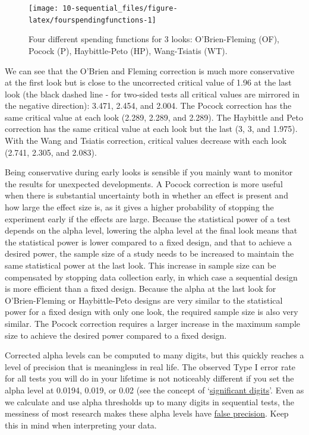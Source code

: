 \documentclass[
  oneside]{krantz}
\begin{document}
\begin{figure}

{\centering \texttt{[image: 10-sequential\_files/figure-latex/fourspendingfunctions-1]} 

}

\caption{Four different spending functions for 3 looks: O'Brien-Fleming (OF), Pocock (P), Haybittle-Peto (HP), Wang-Tsiatis (WT).}\label{fig:fourspendingfunctions}
\end{figure}

We can see that the O'Brien and Fleming correction is much more conservative at the first look but is close to the uncorrected critical value of 1.96 at the last look (the black dashed line - for two-sided tests all critical values are mirrored in the negative direction): 3.471, 2.454, and 2.004. The Pocock correction has the same critical value at each look (2.289, 2.289, and 2.289). The Haybittle and Peto correction has the same critical value at each look but the last (3, 3, and 1.975). With the Wang and Tsiatis correction, critical values decrease with each look (2.741, 2.305, and 2.083).

Being conservative during early looks is sensible if you mainly want to monitor the results for unexpected developments. A Pocock correction is more useful when there is substantial uncertainty both in whether an effect is present and how large the effect size is, as it gives a higher probability of stopping the experiment early if the effects are large. Because the statistical power of a test depends on the alpha level, lowering the alpha level at the final look means that the statistical power is lower compared to a fixed design, and that to achieve a desired power, the sample size of a study needs to be increased to maintain the same statistical power at the last look. This increase in sample size can be compensated by stopping data collection early, in which case a sequential design is more efficient than a fixed design. Because the alpha at the last look for O'Brien-Fleming or Haybittle-Peto designs are very similar to the statistical power for a fixed design with only one look, the required sample size is also very similar. The Pocock correction requires a larger increase in the maximum sample size to achieve the desired power compared to a fixed design.

Corrected alpha levels can be computed to many digits, but this quickly reaches a level of precision that is meaningless in real life. The observed Type I error rate for all tests you will do in your lifetime is not noticeably different if you set the alpha level at 0.0194, 0.019, or 0.02 (see the concept of `\href{https://en.wikipedia.org/wiki/Significant_figures}{significant digits}'. Even as we calculate and use alpha thresholds up to many digits in sequential tests, the messiness of most research makes these alpha levels have \href{https://en.wikipedia.org/wiki/False_precision}{false precision}. Keep this in mind when interpreting your data.
\end{document}
